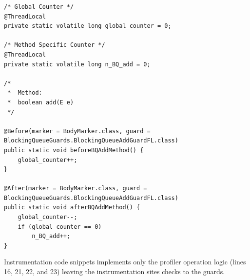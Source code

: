 \documentclass[]{usiinfthesis}
\begin{document}
\vspace*{0.5cm}
\begin{verbatim}
/* Global Counter */
@ThreadLocal
private static volatile long global_counter = 0;

/* Method Specific Counter */
@ThreadLocal
private static volatile long n_BQ_add = 0;

/*
 *  Method:
 *  boolean add(E e)
 */

@Before(marker = BodyMarker.class, guard = BlockingQueueGuards.BlockingQueueAddGuardFL.class)
public static void beforeBQAddMethod() {
    global_counter++;
}

@After(marker = BodyMarker.class, guard = BlockingQueueGuards.BlockingQueueAddGuardFL.class)
public static void afterBQAddMethod() {
    global_counter--;
    if (global_counter == 0)
        n_BQ_add++;
}
\end{verbatim}
\vspace*{0.5cm}
Instrumentation code snippets implements only the profiler operation logic (lines 16, 21, 22, and 23) leaving the instrumentation sites checks to the guards.
\end{document}
